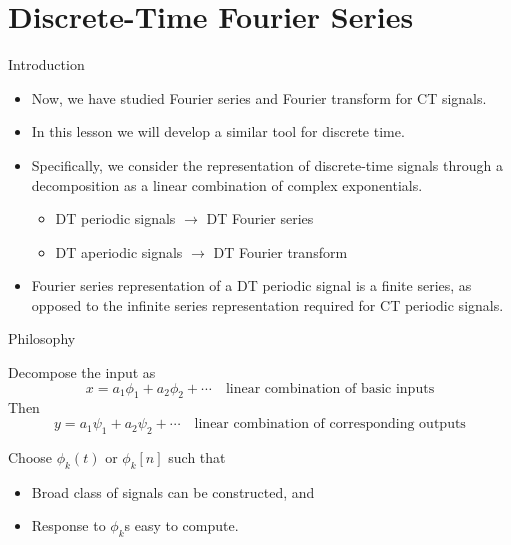 \section{Discrete-Time Fourier Series}

\begin{frame}{Introduction}
    \begin{itemize}[<+->]
        \item Now, we have studied Fourier series and Fourier transform for CT signals.
        \item In this lesson we will develop a similar tool for discrete time.
        \item Specifically, we consider the representation of discrete-time signals through a decomposition as a linear combination of complex exponentials.
            \begin{itemize}
                \item DT periodic signals $\rightarrow$ DT Fourier series
                \item DT aperiodic signals $\rightarrow$ DT Fourier transform
            \end{itemize}
        \item Fourier series representation of a DT periodic signal is a \alert{finite} series, as opposed to the infinite series representation required for CT periodic signals.
    \end{itemize}
\end{frame}


\begin{frame}{Philosophy}
        \begin{center}
        \end{center}
        Decompose the input as
            \begin{equation*}
                x = a_1\phi_1 + a_2\phi_2 + \cdots \quad \text{linear combination of basic inputs}
            \end{equation*}
        Then
            \begin{equation*}
                y = a_1\psi_1 + a_2\psi_2 + \cdots \quad \text{linear combination of corresponding outputs}
            \end{equation*}

        Choose $\phi_k(t)$ or $\phi_k[n]$ such that
        \begin{itemize}
            \item Broad class of signals can be constructed, and
            \item Response to $\phi_k$s easy to compute.
        \end{itemize}
\end{frame}

